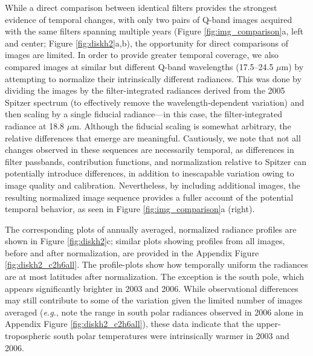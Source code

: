 \documentclass[twocolumn,10pt]{aastex631}
\begin{document}
While a direct comparison between identical filters provides the strongest evidence of temporal changes, with only two pairs of Q-band images acquired with the same filters spanning multiple years (Figure \ref{fig:img_comparison}a, left and center; Figure \ref{fig:diskh2}a,b), the opportunity for direct comparisons of images are limited.  In order to provide greater temporal coverage, we also compared images at similar but different Q-band wavelengths (17.5--24.5 $\mu$m) by attempting to normalize their intrinsically different radiances. This was done by dividing the images by the filter-integrated radiances derived from the 2005 Spitzer spectrum (to effectively remove the wavelength-dependent variation) and then scaling by a single fiducial radiance---in this case, the filter-integrated radiance at 18.8 $\mu$m. Although the fiducial scaling is somewhat arbitrary, the relative differences that emerge are meaningful. Cautiously, we note that not all changes observed in these sequences are necessarily temporal, as differences in filter passbands, contribution functions, and normalization relative to Spitzer can potentially introduce differences, in addition to inescapable variation owing to image quality and calibration.  Nevertheless, by including additional images, the resulting normalized image sequence provides a fuller account of the potential temporal behavior, as seen in Figure \ref{fig:img_comparison}a (right). 

The corresponding plots of annually averaged, normalized radiance profiles are shown in Figure \ref{fig:diskh2}c; similar plots showing profiles from all images, before and after normalization, are provided in the Appendix Figure \ref{fig:diskh2_c2h6all}. The profile-plots show how temporally uniform the radiances are at most latitudes after normalization.  The exception is the south pole, which appears significantly brighter in 2003 and 2006.  While observational differences may still contribute to some of the variation given the limited number of images averaged (\textit{e.g.}, note the range in south polar radiances observed in 2006 alone in Appendix Figure \ref{fig:diskh2_c2h6all}), these data indicate that the upper-tropospheric south polar temperatures were intrinsically warmer in 2003 and 2006.
\end{document}
